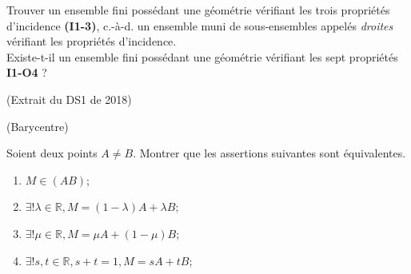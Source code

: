 \documentclass[a4paper,11pt,reqno]{amsart}
\begin{document}
\begin{exo}

  Trouver un ensemble fini possédant une géométrie vérifiant les trois propriétés d'incidence \textbf{(I1-3)}, c.-à-d. un ensemble muni de sous-ensembles appelés \emph{droites} vérifiant les propriétés d'incidence.\\
  Existe-t-il un ensemble fini possédant une géométrie vérifiant les sept propriétés \textbf{I1-O4} ?
\end{exo}

\begin{exo} (Extrait du DS1 de 2018)
\end{exo}

\begin{exo}[.7] (Barycentre)

  Soient deux points $A \neq B$. Montrer que les assertions suivantes sont équivalentes.\\[-1.7\baselineskip]
  \begin{multicols}{2}
    \begin{enumerate}
      \item $M \in (AB)$;
      \item $\exists! \lambda \in \mathbb{R}, M=(1-\lambda) A + \lambda B $;
      \item $\exists! \mu \in \mathbb{R}, M=\mu A + (1-\mu) B $;
      \item $\exists! s,t \in \mathbb{R}, s+t=1, M=s A + t B $;
    \end{enumerate}
  \end{multicols}
\end{exo}
\end{document}
